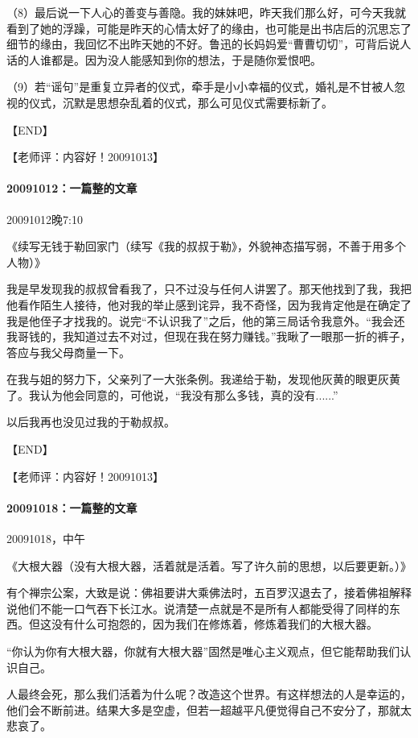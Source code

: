 \documentclass[UTF8]{book}
\begin{document}
（8）最后说一下人心的善变与善隐。我的妹妹吧，昨天我们那么好，可今天我就看到了她的浮躁，可能是昨天的心情太好了的缘由，也可能是出书店后的沉思忘了细节的缘由，我回忆不出昨天她的不好。鲁迅的长妈妈爱“曹曹切切”，可背后说人话的人谁都是。因为没人能感知到你的想法，于是随你爱恨吧。

（9）若“谣句”是重复立异者的仪式，牵手是小小幸福的仪式，婚礼是不甘被人忽视的仪式，沉默是思想杂乱着的仪式，那么可见仪式需要标新了。

【END】

【老师评：内容好！20091013】


\paragraph{20091012：一篇整的文章}
20091012晚7:10

《续写无钱于勒回家门（续写《我的叔叔于勒》，外貌神态描写弱，不善于用多个人物）》

我是早发现我的叔叔曾看我了，只不过没与任何人讲罢了。那天他找到了我，我把他看作陌生人接待，他对我的举止感到诧异，我不奇怪，因为我肯定他是在确定了我是他侄子才找我的。说完“不认识我了”之后，他的第三局话令我意外。“我会还我哥钱的，我知道过去不对过，但现在我在努力赚钱。”我瞅了一眼那一折的裤子，答应与我父母商量一下。

在我与姐的努力下，父亲列了一大张条例。我递给于勒，发现他灰黄的眼更灰黄了。我认为他会同意的，可他说，“我没有那么多钱，真的没有......”

以后我再也没见过我的于勒叔叔。

【END】

【老师评：内容好！20091013】


\paragraph{20091018：一篇整的文章}

20091018，中午

《大根大器（没有大根大器，活着就是活着。写了许久前的思想，以后要更新。）》

有个禅宗公案，大致是说：佛祖要讲大乘佛法时，五百罗汉退去了，接着佛祖解释说他们不能一口气吞下长江水。说清楚一点就是不是所有人都能受得了同样的东西。但这没有什么可抱怨的，因为我们在修炼着，修炼着我们的大根大器。

“你认为你有大根大器，你就有大根大器”固然是唯心主义观点，但它能帮助我们认识自己。

人最终会死，那么我们活着为什么呢？改造这个世界。有这样想法的人是幸运的，他们会不断前进。结果大多是空虚，但若一超越平凡便觉得自己不安分了，那就太悲哀了。
\end{document}
